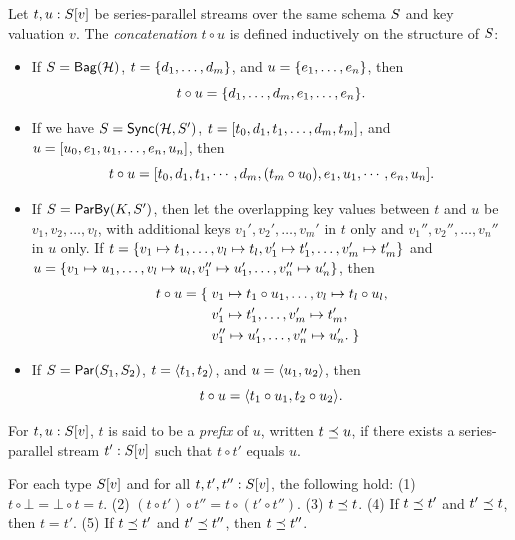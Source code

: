 \begin{definition}
\label{45:def:trace-concat}
Let $t, u: \spstype{v}{\ss}$ be series-parallel streams over the same schema $\ss$ and key valuation $v$.
The  \emph{concatenation} $t \circ u$ is defined inductively on the structure of $\ss$:
\begin{itemize}
\item If $\ss = \relleaf{\mathcal{H}}$,
$t = \spsbag{d_1, \ldots, d_m}$,
and $u = \spsbag{e_1, \ldots, e_n}$,
then
\[t \circ u = \spsbag{d_1, \ldots, d_m, e_1, \ldots, e_n}.\]
\item If we have $\ss = \hier{\mathcal{H}}{\ss'}$,
$t = \spsseq{t_0, d_1, t_1, \ldots, d_m, t_m}$,
and
$u = \spsseq{u_0, e_1, u_1, \ldots, e_n, u_n}$,
then
\[t \circ u =
\spsseq{t_0, d_1, t_1, \cdots, d_m, (t_m \circ u_0), e_1, u_1, \cdots, e_n, u_n}.
\]
\item If $\ss = \keyby{K}{S'}$,
then let the overlapping key values between $t$ and $u$ be
$v_1, v_2, \ldots, v_l$,
with additional keys $v_1', v_2', \ldots, v_m'$ in $t$ only
and $v_1'', v_2'', \ldots, v_n''$ in $u$ only.
If
$t = \spsbag{\keyed{v_1}{t_1}, \ldots, \keyed{v_l}{t_l},
\keyed{v_1'}{t_1'}, \ldots, \keyed{v_m'}{t_m'}}$
and
$u = \spsbag{\keyed{v_1}{u_1}, \ldots, \keyed{v_l}{u_l},
\keyed{v_1''}{u_1'}, \ldots, \keyed{v_n''}{u_n'}}$,
then
\begin{align*}
t \circ u = \spsbagleft{}
&\keyed{v_1}{t_1 \circ u_1}, \ldots, \keyed{v_l}{t_l \circ u_l}, \\
&\keyed{v_1'}{t_1'}, \ldots, \keyed{v_m'}{t_m'}, \\
&\keyed{v_1''}{u_1'}, \ldots, \keyed{v_n''}{u_n'}.\spsbagright{}
\end{align*}
\item If $\ss = \parcomp{\ss_1}{\ss_2}$,
$t = \spspar{t_1}{t_2}$, and $u = \spspar{u_1}{u_2}$,
then
\[
t \circ u = \spspar{t_1 \circ u_1}{t_2 \circ u_2}.
\]
\end{itemize}
For $t, u: \spstype{v}{\ss}$, $t$ is said to be a {\em prefix} of $u$, written $t\prefix u$,
if there exists a series-parallel stream $t' : \spstype{v}{\ss}$ such that $t\circ t'$
equals $u$.
\end{definition}

\begin{proposition}
\label{45:prop:sps-concat-properties}
For each type $\spstype{v}{\ss}$ and for all $t, t', t'': \spstype{v}{\ss}$,
the following hold:
(1) $t \circ \bot = \bot \circ t = t$.
(2) $(t \circ t') \circ t'' = t \circ (t' \circ t'')$.
(3) $t \prefix t$.
(4) If $t \prefix t'$ and $t' \prefix t$, then $t = t'$.
(5) If $t \prefix t'$ and $t' \prefix t''$, then $t \prefix t''$.
\end{proposition}

